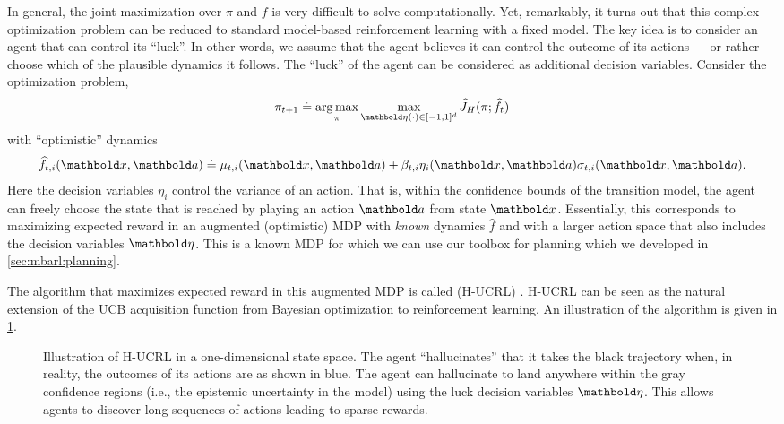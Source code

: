 In general, the joint maximization over $\pi$ and $f$ is very difficult to solve computationally.
Yet, remarkably, it turns out that this complex optimization problem can be reduced to standard model-based reinforcement learning with a fixed model.
The key idea is to consider an agent that can control its ``luck''.
In other words, we assume that the agent believes it can control the outcome of its actions --- or rather choose which of the plausible dynamics it follows.
The ``luck'' of the agent can be considered as additional decision variables.
Consider the optimization problem, \begin{align}
  \pi_{t+1} \defeq \argmax_\pi \max_{\veta(\cdot) \in [-1,1]^d} \J{\pi; \widehat{f}_t}[H]
\end{align} with ``optimistic'' dynamics \begin{align}
  \widehat{f}_{t,i}(\vx, \va) \defeq \mu_{t, i}(\vx, \va) + \beta_{t, i} \eta_i(\vx, \va) \sigma_{t, i}(\vx, \va). \label{eq:dynamics_with_luck}
\end{align}
Here the decision variables $\eta_i$ control the variance of an action.
That is, within the confidence bounds of the transition model, the agent can freely choose the state that is reached by playing an action $\va$ from state $\vx$.
Essentially, this corresponds to maximizing expected reward in an augmented (optimistic) MDP with \emph{known} dynamics $\widehat{f}$ and with a larger action space that also includes the decision variables $\veta$.
This is a known MDP for which we can use our toolbox for planning which we developed in \cref{sec:mbarl:planning}.

The algorithm that maximizes expected reward in this augmented MDP is called  (H-UCRL) \citep{curi2020efficient,treven2023efficient}.
H-UCRL can be seen as the natural extension of the UCB acquisition function from Bayesian optimization to reinforcement learning.
An illustration of the algorithm is given in \cref{fig:hucrl}.

\begin{figure}
  \caption{Illustration of H-UCRL in a one-dimensional state space.
  The agent ``hallucinates'' that it takes the black trajectory when, in reality, the outcomes of its actions are as shown in blue.
  The agent can hallucinate to land anywhere within the gray confidence regions (i.e., the epistemic uncertainty in the model) using the luck decision variables $\veta$.
  This allows agents to discover long sequences of actions leading to sparse rewards.}\label{fig:hucrl}
\end{figure}


